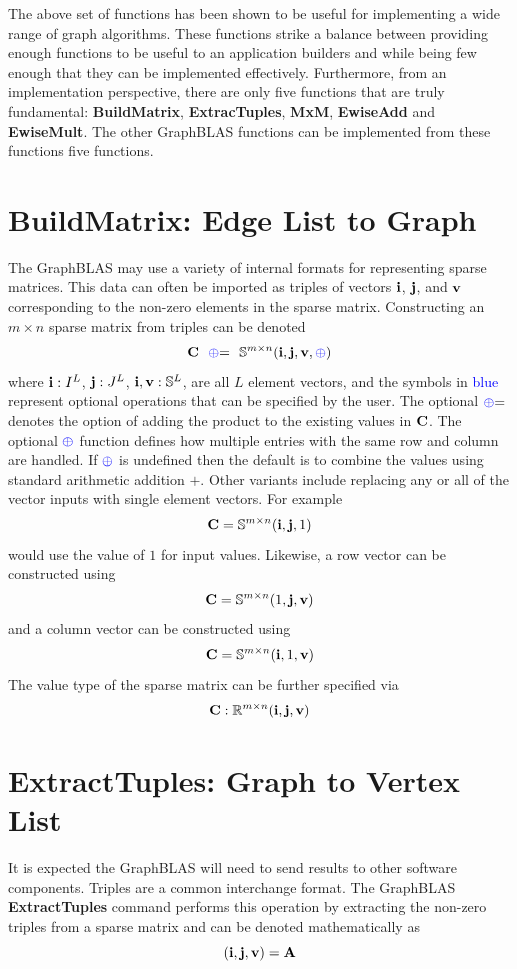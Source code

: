 The above set of functions has been shown to be useful for implementing a wide range of graph algorithms.  These functions strike a balance between providing enough functions to be useful to an application builders and while being few enough that they can be implemented effectively.  Furthermore, from an implementation perspective, there are only five functions that are truly fundamental: {\bf BuildMatrix}, {\bf ExtracTuples}, {\bf MxM},  {\bf EwiseAdd} and {\bf EwiseMult}.  The other GraphBLAS functions can be implemented from these functions five functions.


\section{BuildMatrix: Edge List to Graph}
  The GraphBLAS may use a variety of internal formats for representing sparse matrices.  This data can often be imported as triples of vectors ${\bf i}$, ${\bf j}$, and ${\bf v}$ corresponding to the non-zero elements in the sparse matrix.  Constructing an $m \times n$ sparse matrix from triples can be denoted
$$
   \mathbf{C}  ~~ {\textcolor{blue}{\oplus}}{=} ~~  \mathbb{S}^{m \times n}({\bf i},{\bf j},{\bf v},{\textcolor{blue}{\oplus}})
$$
where ${\bf i} : I^L$, ${\bf j}: J^L$, ${\bf i}, {\bf v}: \mathbb{S}^L$, are all $L$ element vectors, and the symbols in \textcolor{blue}{blue} represent optional operations that can be specified by the user.  The optional ${\textcolor{blue}{\oplus}}{=}$ denotes the option of adding the product to the existing values in ${\bf C}$.  The optional  ${\textcolor{blue}{\oplus}}$ function defines how multiple entries with the same row and column are handled.  If ${\textcolor{blue}{\oplus}}$ is undefined then the default is to combine the values using standard arithmetic addition $+$.  Other variants include replacing any or all of the vector inputs with single element vectors.  For example
$$
   \mathbf{C} = \mathbb{S}^{m \times n}({\bf i},{\bf j},1)
$$
would use the value of $1$ for input values.  Likewise, a row vector can be constructed using
$$
   \mathbf{C} = \mathbb{S}^{m \times n}(1,{\bf j},{\bf v})
$$
and a column vector can be constructed using
$$
   \mathbf{C} = \mathbb{S}^{m \times n}({\bf i},1,{\bf v})
$$
The value type of the sparse matrix can be further specified via
$$
   \mathbf{C}: \mathbb{R}^{m \times n}({\bf i},{\bf j},{\bf v})
$$

\section{ExtractTuples: Graph to Vertex List}
  It is expected the GraphBLAS will need to send results to other software components.  Triples are a common interchange format.  The GraphBLAS {\bf ExtractTuples} command performs this operation by extracting the non-zero triples from a sparse matrix and can be denoted mathematically as
$$
	({\bf i},{\bf j},{\bf v}) = {\bf A}
$$

